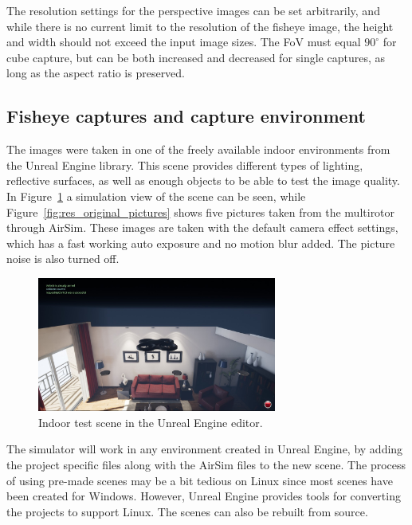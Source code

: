 The resolution settings for the perspective images can be set arbitrarily, and while there is no current limit to the resolution of the fisheye image, the height and width should not exceed the input image sizes. The FoV must equal $90^\circ$ for cube capture, but can be both increased and decreased for single captures, as long as the aspect ratio is preserved. 

\subsection{Fisheye captures and capture environment}

The images were taken in one of the freely available indoor environments from the Unreal Engine library. This scene provides different types of lighting, reflective surfaces, as well as enough objects to be able to test the image quality. In Figure~\ref{fig:res_inflight} a simulation view of the scene can be seen, while Figure~\ref{fig:res_original_pictures} shows five pictures taken from the multirotor through AirSim. These images are taken with the default camera effect settings, which has a fast working auto exposure and no motion blur added. The picture noise is also turned off.

\begin{figure}[!htb]
    \centering
    \includegraphics[width = 0.7\textwidth]{rapport/fig/Results/inflight.jpg}
    \caption{Indoor test scene in the Unreal Engine editor.}
    \label{fig:res_inflight}
\end{figure}

The simulator will work in any environment created in Unreal Engine, by adding the project specific files along with the AirSim files to the new scene. The process of using pre-made scenes may be a bit tedious on Linux since most scenes have been created for Windows. However, Unreal Engine provides tools for converting the projects to support Linux. The scenes can also be rebuilt from source.

